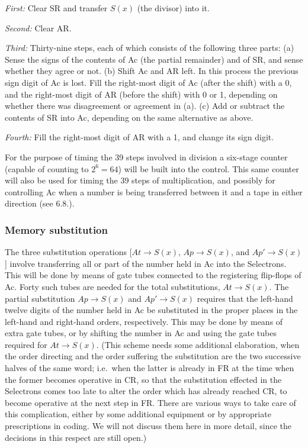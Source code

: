 \documentclass[12pt]{amsart}
\begin{document}
\emph{First:} Clear SR and transfer $S(x)$ (the divisor) into it.

\emph{Second:} Clear AR.

\emph{Third:} Thirty-nine steps, each of which consists of the following three parts: (a) Sense the signs of the contents of Ac (the partial remainder) and of SR, and sense whether they agree or not. (b) Shift Ac and AR left. In this process the previous sign digit of Ac is lost. Fill the right-most digit of Ac (after the shift) with a 0, and the right-most digit of AR (before the shift) with 0 or 1, depending on whether there was disagreement or agreement in (a). (c) Add or subtract the contents of SR into Ac, depending on the same alternative as above.

\emph{Fourth:} Fill the right-most digit of AR with a 1, and change its sign digit.

For the purpose of timing the 39 steps involved in division a six-stage counter (capable of counting to $2^6 = 64$) will be built into the control. This same counter will also be used for timing the 39 steps of multiplication, and possibly for controlling Ac when a number is being transferred between it and a tape in either direction (see 6.8.).

\subsubsection{Memory substitution}
The three substitution operations [$At \rightarrow S(x)$, $Ap \rightarrow S(x)$, and $Ap' \rightarrow S(x)$] involve transferring all or part of the number held in Ac into the Selectrons. This will be done by means of gate tubes connected to the registering flip-flops of Ac. Forty such tubes are needed for the total substitutions, $At \rightarrow S(x)$. The partial substitution $Ap \rightarrow S(x)$ and $Ap' \rightarrow S(x)$ requires that the left-hand twelve digits of the number held in Ac be substituted in the proper places in the left-hand and right-hand orders, respectively. This may be done by means of extra gate tubes, or by shifting the number in Ac and using the gate tubes required for $At \rightarrow S(x)$. (This scheme needs some additional elaboration, when the order directing and the order suffering the substitution are the two successive halves of the same word; i.e.\ when the latter is already in FR at the time when the former becomes operative in CR, so that the substitution effected in the Selectrons comes too late to alter the order which has already reached CR, to become operative at the next step in FR. There are various ways to take care of this complication, either by some additional equipment or by appropriate prescriptions in coding. We will not discuss them here in more detail, since the decisions in this respect are still open.)
\end{document}
